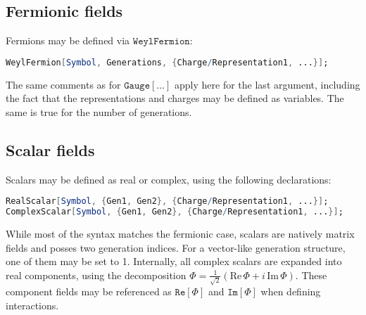 \documentclass{scrartcl}
\begin{document}
\subsection{Fermionic fields}
Fermions may be defined via $\mathtt{WeylFermion}$:
\begin{lstlisting}[language=mathematica,mathescape,columns=flexible,backgroundcolor=\color{light-gray}]
WeylFermion[Symbol, Generations, {Charge/Representation1, ...}];
\end{lstlisting}
The same comments as for $\mathtt{Gauge[\dots]}$ apply here for the last argument, including the fact that the representations and charges may be defined as variables. The same is true for the number of generations.
\FloatBarrier
\subsection{Scalar fields}
Scalars may be defined as real or complex, using the following declarations:
\begin{lstlisting}[language=mathematica,mathescape,columns=flexible,backgroundcolor=\color{light-gray}]
RealScalar[Symbol, {Gen1, Gen2}, {Charge/Representation1, ...}];
ComplexScalar[Symbol, {Gen1, Gen2}, {Charge/Representation1, ...}];
\end{lstlisting}
While most of the syntax matches the fermionic case, scalars are natively matrix fields and posses two generation indices. For a vector-like generation structure, one of them may be set to 1.\newline
Internally, all complex scalars are expanded into real components, using the decomposition $\Phi = \frac{1}{\sqrt{2}} \left(\mathrm{Re} \, \Phi + i \, \mathrm{Im} \,\Phi\right)$. These component fields may be referenced as $\mathtt{Re[\Phi]}$ and $\mathtt{Im[\Phi]}$ when defining interactions.
\FloatBarrier
\end{document}
